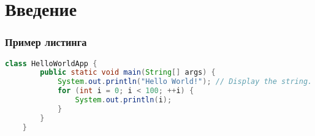 \section{Введение}

\begin{frame}[t, fragile]
    \frametitle{Пример листинга}
    \begin{minipage}[t]{0.49\linewidth}
        \begin{lstlisting}[caption={Sample Java},label={lst:sample-java},language=Java]
	class HelloWorldApp {
		public static void main(String[] args) {
			System.out.println("Hello World!"); // Display the string.
			for (int i = 0; i < 100; ++i) {
				System.out.println(i);
			}
		}
	}
        \end{lstlisting}
    \end{minipage}
\end{frame}